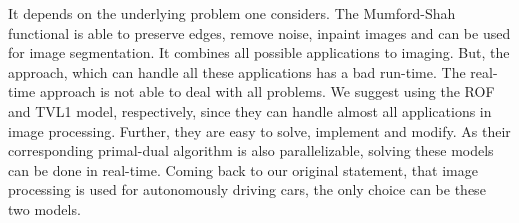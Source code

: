 \documentclass{scrreprt}
\begin{document}
    It depends on the underlying problem one considers. The Mumford-Shah functional is able to preserve edges, remove noise, inpaint images and can be used for image segmentation. It combines all possible applications to imaging. But, the approach, which can handle all these applications has a bad run-time. The real-time approach is not able to deal with all problems. We suggest using the ROF and TVL1 model, respectively, since they can handle almost all applications in image processing. Further, they are easy to solve, implement and modify. As their corresponding primal-dual algorithm is also parallelizable, solving these models can be done in real-time. Coming back to our original statement, that image processing is used for autonomously driving cars, the only choice can be these two models.




\end{document}
